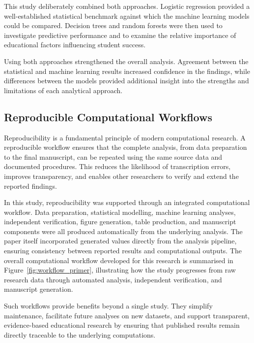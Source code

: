 This study deliberately combined both approaches. Logistic regression provided a well-established statistical benchmark against which the machine learning models could be 
compared. Decision trees and random forests were then used to investigate predictive performance and to examine the relative importance of educational factors influencing 
student success.

Using both approaches strengthened the overall analysis. Agreement between the statistical and machine learning results increased confidence in the findings, 
while differences between the models provided additional insight into the strengths and limitations of each analytical approach.



\subsection{Reproducible Computational Workflows}

Reproducibility is a fundamental principle of modern computational research. A reproducible workflow ensures that the complete analysis, from data preparation to the 
final manuscript, can be repeated using the same source data and documented procedures. This reduces the likelihood of transcription errors, improves transparency, and 
enables other researchers to verify and extend the reported findings.

In this study, reproducibility was supported through an integrated computational workflow. Data preparation, statistical modelling, machine learning analyses, independent 
verification, figure generation, table production, and manuscript components were all produced automatically from the underlying analysis. The paper itself incorporated 
generated values directly from the analysis pipeline, ensuring consistency between reported results and computational outputs. The overall computational workflow 
developed for this research is summarised in Figure~\ref{fig:workflow_primer}, illustrating how the study progresses from raw research data through automated analysis, 
independent verification, and manuscript generation.

Such workflows provide benefits beyond a single study. They simplify maintenance, facilitate future analyses on new datasets, and support transparent, evidence-based 
educational research by ensuring that published results remain directly traceable to the underlying computations.

